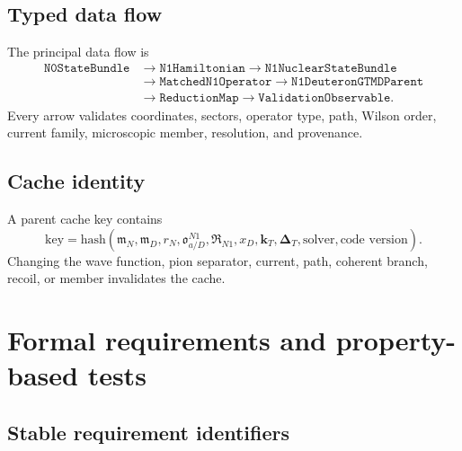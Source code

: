 \documentclass[11pt]{article}
\newcommand{\kT}{\bm{k}_{T}}
\newcommand{\DT}{\bm{\Delta}_{T}}
\newcommand{\StateBundle}{\texttt{N1NuclearStateBundle}}
\begin{document}
\subsection{Typed data flow}

The principal data flow is
\begin{equation}
 \begin{aligned}
 \texttt{N0StateBundle}
 &\longrightarrow
 \texttt{N1Hamiltonian}
 \longrightarrow
 \StateBundle
 \\
 &\longrightarrow
 \texttt{MatchedN1Operator}
 \longrightarrow
 \texttt{N1DeuteronGTMDParent}
 \\
 &\longrightarrow
 \texttt{ReductionMap}
 \longrightarrow
 \texttt{ValidationObservable}.
 \end{aligned}
 \label{eq:n1-data-flow}
\end{equation}
Every arrow validates coordinates, sectors, operator type, path, Wilson order,
current family, microscopic member, resolution, and provenance.

\subsection{Cache identity}

A parent cache key contains
\begin{equation}
 \mathrm{key}
 =\mathrm{hash}
 \left(
 \mathfrak m_N,
 \mathfrak m_D,
 r_N,
 \mathfrak o_{a/D}^{N1},
 \mathfrak R_{N1},
 x_D,\kT,\DT,
 \text{solver},
 \text{code version}
 \right).
 \label{eq:n1-cache-key}
\end{equation}
Changing the wave function, pion separator, current, path, coherent branch,
recoil, or member invalidates the cache.

\section{Formal requirements and property-based tests}
\label{sec:requirements}

\subsection{Stable requirement identifiers}
\end{document}
